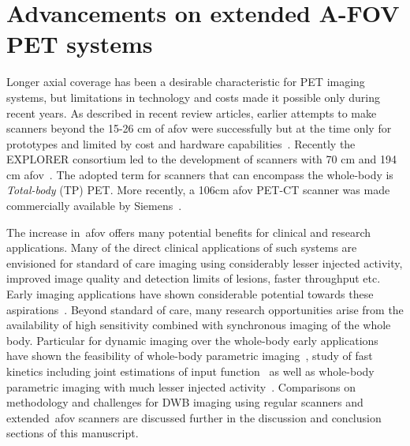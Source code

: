 \section{Advancements on extended A-FOV PET systems}
Longer axial coverage has been a desirable characteristic for PET imaging systems, but limitations in technology and costs made it possible only during recent years. 
As described in recent review articles, earlier attempts to make scanners beyond the 15-26 cm of \gls{afov} were successfully but at the time only for prototypes and limited by cost and hardware capabilities~\cite{Vandenberghe2020,Surti2020}.
Recently the EXPLORER consortium led to the development of scanners with 70 cm and 194 cm \gls{afov}~\cite{Karp2020,Cherry2017}. The adopted term for scanners that can encompass the whole-body is \textit{Total-body} (TP) PET. More recently, a 106cm \gls{afov} PET-CT scanner was made commercially available by Siemens~\cite{Siegel2020}. 

The increase in~\gls{afov} offers many potential benefits for clinical and research applications. 
Many of the direct clinical applications of such systems are envisioned for standard of care imaging using considerably lesser injected activity, improved image quality and detection limits of lesions, faster throughput etc. Early imaging applications have shown considerable potential towards these aspirations~\cite{Badawi2019,Pantel2020}.
Beyond standard of care, many research opportunities arise from the availability of high sensitivity combined with synchronous imaging of the whole body. 
Particular for dynamic imaging over the whole-body early applications have shown the feasibility of whole-body parametric imaging~\cite{Zhang2020a,Zhang2020b,Wang208}, study of fast kinetics including joint estimations of input function~\cite{Feng2019,Feng2021} as well as whole-body parametric imaging with much lesser injected activity~\cite{Liu2021}.
Comparisons on methodology and challenges for DWB imaging using regular scanners and extended~\gls{afov} scanners are discussed further in the discussion and conclusion sections of this manuscript.

